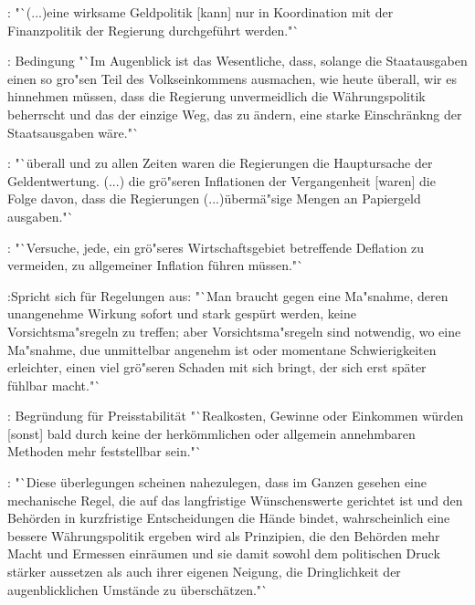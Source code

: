 \documentclass[
    onecolumn,
    a4paper,
    abstracton,
    parskip=half
    ,final
    ]{scrartcl}
\begin{document}
\citep[vgl.][S.413]{hayek1971die}: "`(...)eine wirksame Geldpolitik [kann] nur in Koordination mit der Finanzpolitik der Regierung durchgef{\"u}hrt werden."`

\citep[vgl.][S.413]{hayek1971die}: Bedingung "`Im Augenblick ist das Wesentliche, dass, solange die Staatausgaben einen so gro{"s}en Teil des Volkseinkommens ausmachen, wie heute {\"u}berall, wir es hinnehmen m{\"u}ssen, dass die Regierung unvermeidlich die W{\"a}hrungspolitik beherrscht und das der einzige Weg, das zu {\"a}ndern, eine starke Einschr{\"a}nkng der Staatsausgaben w{\"a}re."`

\citep[vgl.][S.413]{hayek1971die}: "`{\"u}berall und zu allen Zeiten waren die Regierungen die Hauptursache der Geldentwertung. (...) die gr{\"o}{"s}eren Inflationen der Vergangenheit [waren] die Folge davon, dass die Regierungen (...){\"u}berm{\"a}{"s}ige Mengen an Papiergeld ausgaben."`

\citep[vgl.][S.416]{hayek1971die}: "`Versuche, jede, ein gr{\"o}{"s}eres Wirtschaftsgebiet betreffende Deflation zu vermeiden, zu allgemeiner Inflation f{\"u}hren m{\"u}ssen."`



\citep[vgl.][S.416]{hayek1971die}:Spricht sich f{\"u}r Regelungen aus: "`Man braucht gegen eine Ma{"s}nahme, deren unangenehme Wirkung sofort und stark gesp{\"u}rt werden, keine Vorsichtsma{"s}regeln zu treffen; aber Vorsichtsma{"s}regeln sind notwendig, wo eine Ma{"s}nahme, due unmittelbar angenehm ist oder momentane Schwierigkeiten erleichter, einen viel gr{\"o}{"s}eren Schaden mit sich bringt, der sich erst sp{\"a}ter f{\"u}hlbar macht."`




\citep[vgl.][S.418]{hayek1971die}: Begr{\"u}ndung f{\"u}r Preisstabilit{\"a}t "`Realkosten, Gewinne oder Einkommen w{\"u}rden [sonst] bald durch keine der herk{\"o}mmlichen oder allgemein annehmbaren Methoden mehr feststellbar sein."`

\citep[vgl.][S.419]{hayek1971die}: "`Diese {\"u}berlegungen scheinen nahezulegen, dass im Ganzen gesehen eine mechanische Regel, die auf das langfristige W{\"u}nschenswerte gerichtet ist und den Beh{\"o}rden in kurzfristige Entscheidungen die H{\"a}nde bindet, wahrscheinlich eine bessere W{\"a}hrungspolitik ergeben wird als Prinzipien, die den Beh{\"o}rden mehr Macht und Ermessen einr{\"a}umen und sie damit sowohl dem politischen Druck st{\"a}rker aussetzen als auch ihrer eigenen Neigung, die Dringlichkeit der augenblicklichen Umst{\"a}nde zu {\"u}bersch{\"a}tzen."`
\end{document}
